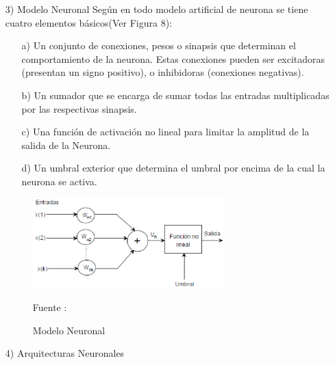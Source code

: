\documentclass[a4paper, 12pt]{article}
\begin{document}
\begin{enumerate}
\item[3)] Modelo Neuronal
\vskip 0.3cm
Según \cite{serrano} en todo modelo artificial de neurona se tiene cuatro elementos básicos(Ver Figura 8):
\begin{enumerate}
\item[a)] Un conjunto de conexiones, pesos o sinapsis que determinan el comportamiento de la neurona. Estas conexiones pueden ser excitadoras (presentan un signo positivo), o inhibidoras (conexiones negativas).\par
\item[b)] Un sumador que se encarga de sumar todas las entradas multiplicadas por las respectivas sinapsis.
\item[c)] Una función de activación no lineal para limitar la amplitud de la salida de la Neurona.
\item[d)] Un umbral exterior que determina el umbral por encima de la cual la neurona se activa.
\end{enumerate}

\begin{figure}[ht]
\begin{center}
\includegraphics[width=0.7\textwidth]{modelo_neuronal}
\end{center}
\begin{center}
\vskip -0.5cm
\caption{\small{Modelo Neuronal}}
{\small{Fuente : \cite{serrano}}}
\end{center}
\end{figure}

\vskip 4cm

\item[4)] Arquitecturas Neuronales
\vskip 0.3cm
\begin{enumerate}


\end{enumerate}
\end{enumerate}
\end{document}
